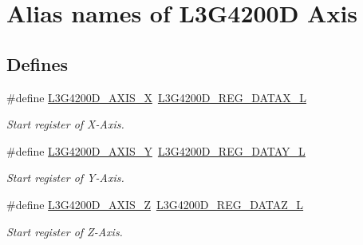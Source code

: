 \hypertarget{group___l3_g4200_d___a_x_i_s}{\section{\-Alias names of \-L3\-G4200\-D \-Axis}
\label{group___l3_g4200_d___a_x_i_s}
}
\subsection*{\-Defines}
\begin{DoxyCompactItemize}
\item 
\hypertarget{group___l3_g4200_d___a_x_i_s_ga7367808c23b425254b6a1ace8ec11623}{\#define \hyperlink{group___l3_g4200_d___a_x_i_s_ga7367808c23b425254b6a1ace8ec11623}{\-L3\-G4200\-D\-\_\-\-A\-X\-I\-S\-\_\-\-X}~\hyperlink{group___l3_g4200_d___r_e_g_i_s_t_e_r_s_gafbad426ec9eafa3e09f42dd2ed2a0736}{\-L3\-G4200\-D\-\_\-\-R\-E\-G\-\_\-\-D\-A\-T\-A\-X\-\_\-\-L}}\label{group___l3_g4200_d___a_x_i_s_ga7367808c23b425254b6a1ace8ec11623}

\begin{DoxyCompactList}\small\item\em \-Start register of \-X-\/\-Axis. \end{DoxyCompactList}\item 
\hypertarget{group___l3_g4200_d___a_x_i_s_ga2c6f3cbbb3b16689b44241c18d1780a1}{\#define \hyperlink{group___l3_g4200_d___a_x_i_s_ga2c6f3cbbb3b16689b44241c18d1780a1}{\-L3\-G4200\-D\-\_\-\-A\-X\-I\-S\-\_\-\-Y}~\hyperlink{group___l3_g4200_d___r_e_g_i_s_t_e_r_s_ga7a1702cabf5046f28ce3824e4ae9f8a9}{\-L3\-G4200\-D\-\_\-\-R\-E\-G\-\_\-\-D\-A\-T\-A\-Y\-\_\-\-L}}\label{group___l3_g4200_d___a_x_i_s_ga2c6f3cbbb3b16689b44241c18d1780a1}

\begin{DoxyCompactList}\small\item\em \-Start register of \-Y-\/\-Axis. \end{DoxyCompactList}\item 
\hypertarget{group___l3_g4200_d___a_x_i_s_gaab65ddff59998ccd400f3c4fb29ee00c}{\#define \hyperlink{group___l3_g4200_d___a_x_i_s_gaab65ddff59998ccd400f3c4fb29ee00c}{\-L3\-G4200\-D\-\_\-\-A\-X\-I\-S\-\_\-\-Z}~\hyperlink{group___l3_g4200_d___r_e_g_i_s_t_e_r_s_ga59b07ccd68c25b0343eaed5988f12028}{\-L3\-G4200\-D\-\_\-\-R\-E\-G\-\_\-\-D\-A\-T\-A\-Z\-\_\-\-L}}\label{group___l3_g4200_d___a_x_i_s_gaab65ddff59998ccd400f3c4fb29ee00c}

\begin{DoxyCompactList}\small\item\em \-Start register of \-Z-\/\-Axis. \end{DoxyCompactList}\end{DoxyCompactItemize}
